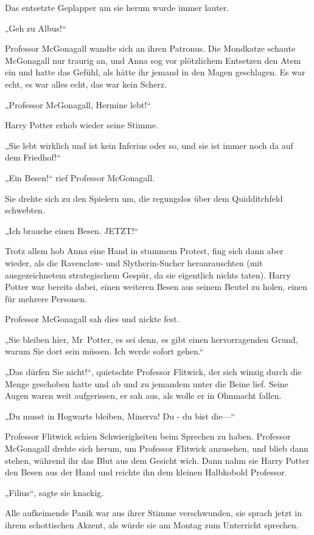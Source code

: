 {Das entsetzte Geplapper um sie herum wurde immer lauter.

„Geh zu Albus!“

Professor McGonagall wandte sich an ihren Patronus. Die Mondkatze schaute McGonagall nur traurig an, und Anna sog vor plötzlichem Entsetzen den Atem ein und hatte das Gefühl, als hätte ihr jemand in den Magen geschlagen. Es war echt, es war alles echt, das war kein Scherz.

„Professor McGonagall, Hermine lebt!“

Harry Potter erhob wieder seine Stimme.

„Sie lebt wirklich und ist kein Inferius oder so, und sie ist immer noch da auf dem Friedhof!“

„Ein Besen!“ rief Professor McGonagall.

Sie drehte sich zu den Spielern um, die regungslos über dem Quidditchfeld schwebten.

„Ich brauche einen Besen. JETZT!“

Trotz allem hob Anna eine Hand in stummem Protest, fing sich dann aber wieder, als die Ravenclaw- und Slytherin-Sucher heranrauschten (mit ausgezeichnetem strategischem Gespür, da sie eigentlich nichts taten). Harry Potter war bereits dabei, einen weiteren Besen aus seinem Beutel zu holen, einen für mehrere Personen.

Professor McGonagall sah dies und nickte fest.

„Sie bleiben hier, Mr~Potter, es sei denn, es gibt einen hervorragenden Grund, warum Sie dort sein müssen. Ich werde sofort gehen.“

„Das dürfen Sie nicht!“, quietschte Professor Flitwick, der sich winzig durch die Menge geschoben hatte und ab und zu jemandem unter die Beine lief. Seine Augen waren weit aufgerissen, er sah aus, als wolle er in Ohnmacht fallen.

„Du musst in Hogwarts bleiben, Minerva! Du - du bist die—“

Professor Flitwick schien Schwierigkeiten beim Sprechen zu haben. Professor McGonagall drehte sich herum, um Professor Flitwick anzusehen, und blieb dann stehen, während ihr das Blut aus dem Gesicht wich. Dann nahm sie Harry Potter den Besen aus der Hand und reichte ihn dem kleinen Halbkobold Professor.

„Filius“, sagte sie knackig.

Alle aufkeimende Panik war aus ihrer Stimme verschwunden, sie sprach jetzt in ihrem schottischen Akzent, als würde sie am Montag zum Unterricht sprechen.

}
